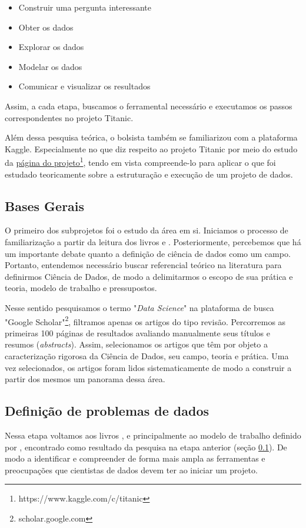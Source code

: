 \documentclass{article}
\begin{document}
\begin{itemize}
\item Construir uma pergunta interessante
\item Obter os dados
\item Explorar os dados
\item Modelar os dados
\item Comunicar e visualizar os resultados
\end{itemize}

Assim, a cada etapa, buscamos o ferramental necessário e executamos os passos correspondentes no projeto Titanic. 

Além dessa pesquisa teórica, o bolsista também se familiarizou com a plataforma Kaggle. Especialmente no que diz respeito ao projeto Titanic por meio do estudo da \href{https://www.kaggle.com/c/titanic}{página do projeto}\footnote{https://www.kaggle.com/c/titanic}, tendo em vista compreende-lo para aplicar o que foi estudado teoricamente sobre a estruturação e execução de um projeto de dados.


\subsection{Bases Gerais}\label{Bases Gerais}
O primeiro dos subprojetos foi o estudo da área em si. Iniciamos o processo de familiarização a partir da leitura dos livros \cite{PRINCIPLES} e \cite{DOING}. 
Posteriormente, percebemos que há um importante debate quanto a definição de ciência de dados como um campo. Portanto, entendemos necessário buscar referencial teórico na literatura para definirmos Ciência de Dados, de modo a delimitarmos o escopo de sua prática e teoria, modelo de trabalho e pressupostos.

Nesse sentido pesquisamos o termo "\textit{Data Science}" na plataforma de busca "Google Scholar"\footnote{scholar.google.com}, filtramos apenas os artigos do tipo revisão. Percorremos as primeiras 100 páginas de resultados avaliando manualmente seus títulos e resumos (\textit{abstracts}). Assim, selecionamos os artigos que têm por objeto a caracterização rigorosa da Ciência de Dados, seu campo, teoria e prática. Uma vez selecionados, os artigos foram lidos sistematicamente de modo a construir a partir dos mesmos um panorama dessa área. 

\subsection{Definição de problemas de dados}
Nessa etapa voltamos aos livros \cite{DATAPYTHON}, \cite{PRINCIPLES} e principalmente ao modelo de trabalho definido por \cite{BATON}, encontrado como resultado da pesquisa na etapa anterior (seção \ref{Bases Gerais}). De modo a identificar e compreender de forma mais ampla as ferramentas e preocupações que cientistas de dados devem ter ao iniciar um projeto. 
\end{document}
